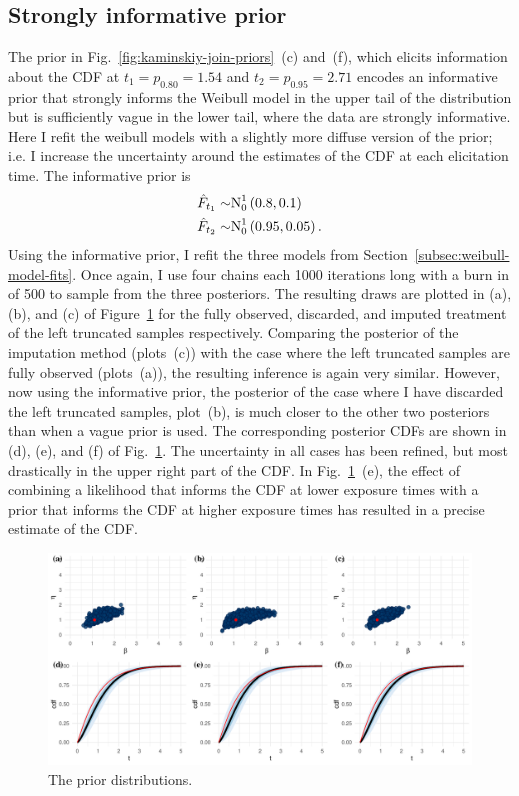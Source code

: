 \subsection{Strongly informative prior}

The prior in Fig.~\ref{fig:kaminskiy-join-priors}~(c) and~(f), which elicits information about the CDF at $t_1 = p_{0.80} = 1.54$ and $t_2 = p_{0.95} = 2.71$ encodes an informative prior that strongly informs the Weibull model in the upper tail of the distribution but is sufficiently vague in the lower tail, where the data are strongly informative. Here I refit the weibull models with a slightly more diffuse version of the prior; i.e. I increase the uncertainty around the estimates of the CDF at each elicitation time. The informative prior is
\begin{align*}
    \hat{F}_{t_1} \sim & \hbox{N}^{1}_{0}\left(0.8, 0.1\right)    \\
    \hat{F}_{t_2} \sim & \hbox{N}^{1}_{0}\left(0.95, 0.05\right).
\end{align*}
Using the informative prior, I refit the three models from Section~\ref{subsec:weibull-model-fits}. Once again, I use four chains each 1000 iterations long with a burn in of 500 to sample from the three posteriors. The resulting draws are plotted in (a), (b), and (c) of Figure~\ref{fig:joint-post-weibull-inf} for the fully observed, discarded, and imputed treatment of the left truncated samples respectively. Comparing the posterior of the imputation method (plots~(c)) with the case where the left truncated samples are fully observed (plots~(a)), the resulting inference is again very similar. However, now using the informative prior, the posterior of the case where I have discarded the left truncated samples, plot~(b), is much closer to the other two posteriors than when a vague prior is used. The corresponding posterior CDFs are shown in (d), (e), and (f) of Fig.~\ref{fig:joint-post-weibull-inf}. The uncertainty in all cases has been refined, but most drastically in the upper right part of the CDF. In Fig.~\ref{fig:joint-post-weibull-inf}~(e), the effect of combining a likelihood that informs the CDF at lower exposure times with a prior that informs the CDF at higher exposure times has resulted in a precise estimate of the CDF. 

\begin{figure}
    \centering
    \includegraphics[width=1\textwidth]{./figures/ch-2/joint-posts-inf.pdf}
    \caption{The prior distributions.}
    \label{fig:joint-post-weibull-inf}
\end{figure}

